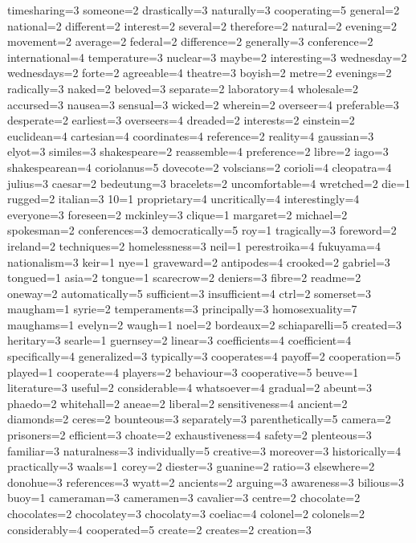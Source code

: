 timesharing=3 
someone=2 
drastically=3 
naturally=3 
cooperating=5 
general=2 
national=2 
different=2 
interest=2 
several=2 
therefore=2 
natural=2 
evening=2 
movement=2 
average=2 
federal=2 
difference=2 
generally=3 
conference=2 
international=4  
temperature=3 
nuclear=3 
maybe=2 
interesting=3   
wednesday=2 
wednesdays=2 
forte=2 
agreeable=4 
theatre=3 
boyish=2 
metre=2 
evenings=2   
radically=3 
naked=2 
beloved=3 
separate=2 
laboratory=4 
wholesale=2 
accursed=3 
nausea=3 
sensual=3 
wicked=2 
wherein=2 
overseer=4 
preferable=3 
desperate=2 
earliest=3  
overseers=4 
dreaded=2 
interests=2 
einstein=2 
euclidean=4 
cartesian=4 
coordinates=4 
reference=2  
reality=4  
gaussian=3 
elyot=3 
similes=3 
shakespeare=2 
reassemble=4 
preference=2 
libre=2  
iago=3 
shakespearean=4 
coriolanus=5 
dovecote=2 
volscians=2 
corioli=4 
cleopatra=4 
julius=3 
caesar=2 
bedeutung=3 
bracelets=2 
uncomfortable=4 
wretched=2 
die=1 
rugged=2 
italian=3 
10=1 
proprietary=4 
uncritically=4 
interestingly=4 
everyone=3 
foreseen=2 
mckinley=3 
clique=1 
margaret=2 
michael=2 
spokesman=2 
conferences=3 
democratically=5 
roy=1 
tragically=3 
foreword=2 
ireland=2 
techniques=2 
homelessness=3 
neil=1
perestroika=4 
fukuyama=4 
nationalism=3 
keir=1 
nye=1 
graveward=2  
antipodes=4 
crooked=2 
gabriel=3 
tongued=1 
asia=2 
tongue=1 
scarecrow=2 
deniers=3 
fibre=2 
readme=2 
oneway=2 
automatically=5 
sufficient=3 
insufficient=4 
ctrl=2 
somerset=3 
maugham=1 
syrie=2 
temperaments=3 
principally=3 
homosexuality=7 
maughams=1 
evelyn=2 
waugh=1 
noel=2 
bordeaux=2 
schiaparelli=5 
created=3 
heritary=3 
searle=1  
guernsey=2 
linear=3 
coefficients=4 
coefficient=4 
specifically=4 
generalized=3 
typically=3 
cooperates=4 
payoff=2 
cooperation=5 
played=1 
cooperate=4 
players=2 
behaviour=3 
cooperative=5 
beuve=1 
literature=3 
useful=2 
considerable=4 
whatsoever=4 
gradual=2 
abeunt=3 
phaedo=2 
whitehall=2 
aneae=2 
liberal=2 
sensitiveness=4 
ancient=2 
diamonds=2 
ceres=2 
bounteous=3 
separately=3 
parenthetically=5 
camera=2 
prisoners=2 
efficient=3 
choate=2 
exhaustiveness=4 
safety=2 
plenteous=3 
familiar=3 
naturalness=3 
individually=5 
creative=3 
moreover=3 
historically=4 
practically=3 
waals=1 
corey=2 
diester=3 
guanine=2 
ratio=3 
elsewhere=2 
donohue=3 
references=3 
wyatt=2 
ancients=2 
arguing=3 
awareness=3 
bilious=3 
buoy=1 
cameraman=3 
cameramen=3 
cavalier=3 
centre=2 
chocolate=2 
chocolates=2 
chocolatey=3 
chocolaty=3 
coeliac=4 
colonel=2 
colonels=2 
considerably=4 
cooperated=5 
create=2 
creates=2 
creation=3 
